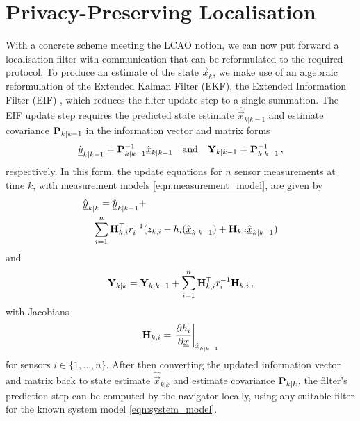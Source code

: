 \documentclass[10pt,letterpaper,oneside,twocolumn,journal]{IEEEtran}
\theoremstyle{definition}
\theoremstyle{definition}
\theoremstyle{remark}
\begin{document}
\section{Privacy-Preserving Localisation} \label{sec:priv_localisation}
With a concrete scheme meeting the LCAO notion, we can now put forward a localisation filter with communication that can be reformulated to the required protocol. To produce an estimate of the state $\vec{x}_k$, we make use of an algebraic reformulation of the Extended Kalman Filter (EKF), the Extended Information Filter (EIF) \cite{maybeckStochasticModelsEstimation1982}, which reduces the filter update step to a single summation. The EIF update step requires the predicted state estimate $\hat{\vec{x}}_{k|k-1}$ and estimate covariance ${{\mathbf{P}}}_{k|k-1}$ in the information vector and matrix forms
\begin{equation}
    \hat{{\underline{y}}}_{k|k-1} = {{\mathbf{P}}}_{k|k-1}^{-1}\hat{{\underline{x}}}_{k|k-1} \quad\textrm{and}\quad {\ensuremath{{\mathbf{Y}}}}_{k|k-1} = {{\mathbf{P}}}_{k|k-1}^{-1}\,,
\end{equation}
respectively. In this form, the update equations for $n$ sensor measurements at time $k$, with measurement models \eqref{eqn:measurement_model}, are given by
\begin{equation}
    \begin{split}
        &\hat{\vec{y}}_{k|k} = \hat{\vec{y}}_{k|k-1} + \\
        &\quad \sum^n_{i=1}\mat{H}^\top_{k,i} r^{-1}_i (z_{k,i} - h_i(\hat{\vec{x}}_{k|k-1}) + \mat{H}_{k,i}\hat{\vec{x}}_{k|k-1})
    \end{split} \label{eqn:eif_info_vec_update}
\end{equation}
and
\begin{equation}
    \mat{Y}_{k|k} = \mat{Y}_{k|k-1} + \sum^n_{i=1}\mat{H}^\top_{k,i} r^{-1}_i \mat{H}_{k,i}\,, \label{eqn:eif_info_mat_update}
\end{equation}
with Jacobians
\begin{equation}
    \mat{H}_{k,i} = \left.\frac{\partial h_i}{\partial \vec{x}}\right|_{\hat{\vec{x}}_{k|k-1}} \label{eqn:measurement_jacobian}
\end{equation}
for sensors $i\in\{1,\dots,n\}$. After then converting the updated information vector and matrix back to state estimate $\hat{\vec{x}}_{k|k}$ and estimate covariance ${{\mathbf{P}}}_{k|k}$, the filter's prediction step can be computed by the navigator locally, using any suitable filter for the known system model \eqref{eqn:system_model}.
\end{document}
